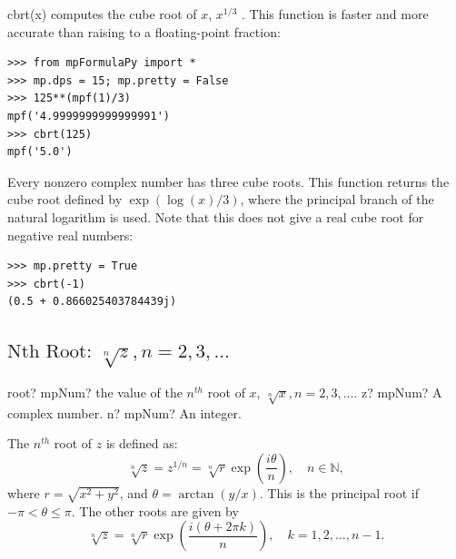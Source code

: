 \vspace{0.3cm}

cbrt(x) computes the cube root of $x$, $x^{1/3}$ . This function is faster and more accurate than raising to a floating-point fraction:

\begin{lstlisting}
>>> from mpFormulaPy import *
>>> mp.dps = 15; mp.pretty = False
>>> 125**(mpf(1)/3)
mpf('4.9999999999999991')
>>> cbrt(125)
mpf('5.0')
\end{lstlisting}


Every nonzero complex number has three cube roots. This function returns the cube
root defined by $\exp(\log(x)/3)$, where the principal branch of the natural logarithm is used. Note that this does not give a real cube root for negative real numbers:
\begin{lstlisting}
>>> mp.pretty = True
>>> cbrt(-1)
(0.5 + 0.866025403784439j)
\end{lstlisting}




\subsection{\texorpdfstring{$\text{Nth Root: }\sqrt[n]{z}, n=2,3,...$}{nthRoot}}



\begin{mpFunctionsExtract}
	\mpFunctionTwo
	{root? mpNum? the value of the $n^{th}$ root of $x$, $\sqrt[n]{x}, n=2,3,...$.}
	{z? mpNum? A complex number.}
	{n? mpNum? An integer.}
\end{mpFunctionsExtract}


\vspace{0.3cm}
The $n^{th}$ root of $z$ is defined as: 
\begin{equation}
	\sqrt[n]{z} = z^{1/n} = \sqrt[n]{r}  \exp\left(\frac{i \theta}{n}\right), \quad  n \in  \mathbb{N},
\end{equation}
where $r=\sqrt{x^2+y^2}$, and $\theta=\arctan(y/x)$. This is the principal root if $-\pi<\theta \leq \pi$.
The other roots are given by
\begin{equation}
	\sqrt[n]{z} = \sqrt[n]{r}  \exp\left(\frac{i (\theta+2\pi k)}{n}\right) , \quad  k=1, 2, \ldots, n-1.
\end{equation}

%


